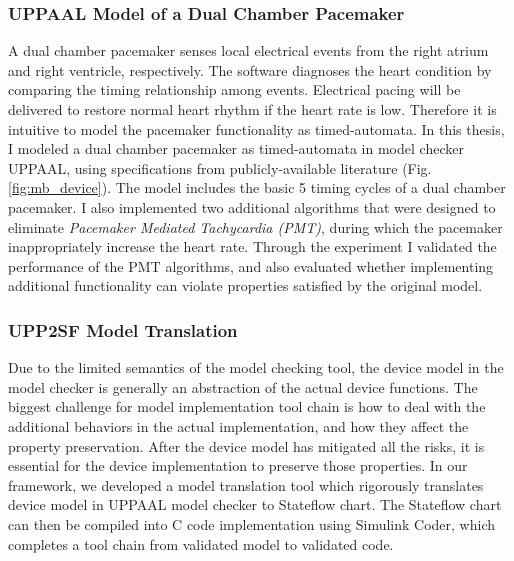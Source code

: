 \documentclass[a4paper]{article}
\begin{document}
\subsubsection{UPPAAL Model of a Dual Chamber Pacemaker}
A dual chamber pacemaker senses local electrical events from the right atrium and right ventricle, respectively.
The software diagnoses the heart condition by comparing the timing relationship among events.
Electrical pacing will be delivered to restore normal heart rhythm if the heart rate is low.
Therefore it is intuitive to model the pacemaker functionality as timed-automata.
In this thesis, I modeled a dual chamber pacemaker as timed-automata in model checker UPPAAL, using specifications from publicly-available literature (Fig. \ref{fig:mb_device}).
The model includes the basic 5 timing cycles of a dual chamber pacemaker.
I also implemented two additional algorithms that were designed to eliminate \emph{Pacemaker Mediated Tachycardia (PMT)}, during which the pacemaker inappropriately increase the heart rate.
Through the experiment I validated the performance of the PMT algorithms, and also evaluated whether implementing additional functionality can violate properties satisfied by the original model.
\subsubsection{UPP2SF Model Translation}
Due to the limited semantics of the model checking tool, the device model in the model checker is generally an abstraction of the actual device functions.
The biggest challenge for model implementation tool chain is how to deal with the additional behaviors in the actual implementation, and how they affect the property preservation.
After the device model has mitigated all the risks, it is essential for the device implementation to preserve those properties.
In our framework, we developed a model translation tool which rigorously translates device model in UPPAAL model checker to Stateflow chart.
The Stateflow chart can then be compiled into C code implementation using Simulink Coder, which completes a tool chain from validated model to validated code.
\end{document}
